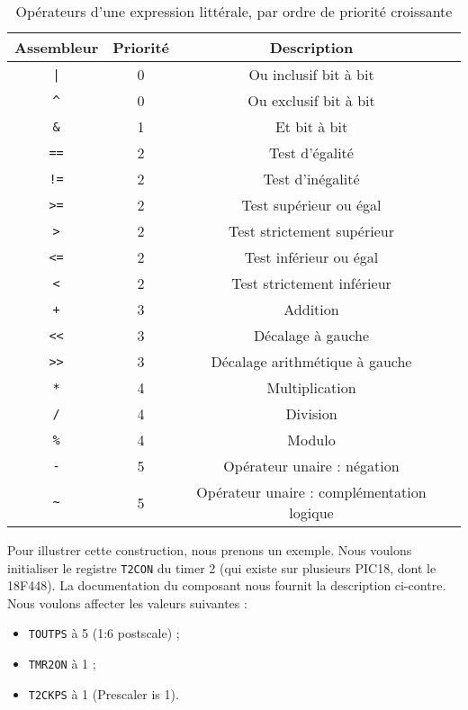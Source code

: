 \begin{table}[!ht]
  \centering
  \begin{tabular}{cccc}
    \textbf{Assembleur} & \textbf{Priorité} & \textbf{Description}\\
    \hline
    \texttt{|} & 0 & Ou inclusif bit à bit \\
    \texttt{\^{}} & 0 & Ou exclusif bit à bit \\
    \texttt{\&} & 1 & Et bit à bit \\
    \texttt{==} & 2 & Test d'égalité \\
    \texttt{!=} & 2 & Test d'inégalité \\
    \texttt{>=} & 2 & Test supérieur ou égal \\
    \texttt{>} & 2 & Test strictement supérieur \\
    \texttt{<=} & 2 & Test inférieur ou égal \\
    \texttt{<} & 2 & Test strictement inférieur \\
    \texttt{+} & 3 & Addition \\
    \texttt{<{}<} & 3 & Décalage à gauche \\
    \texttt{>{}>} & 3 & Décalage arithmétique à gauche \\
    \texttt{*} & 4 & Multiplication \\
    \texttt{/} & 4 & Division \\
    \texttt{\%} & 4 & Modulo \\
    \texttt{-} & 5 & Opérateur unaire : négation \\
    \texttt{\textasciitilde} & 5 & Opérateur unaire : complémentation logique \\
    \hline
  \end{tabular}
  \caption{Opérateurs d'une expression littérale, par ordre de priorité croissante}
\end{table}




Pour illustrer cette construction, nous prenons un exemple. Nous voulons initialiser le registre \texttt{T2CON} du timer 2 (qui existe sur plusieurs PIC18, dont le 18F448). La documentation du composant nous fournit la description ci-contre. Nous voulons affecter les valeurs suivantes :\begin{itemize}
  \item \texttt{TOUTPS} à 5 (1:6 postscale) ;
  \item \texttt{TMR2ON} à 1 ;
  \item \texttt{T2CKPS} à 1 (Prescaler is 1).
\end{itemize}

